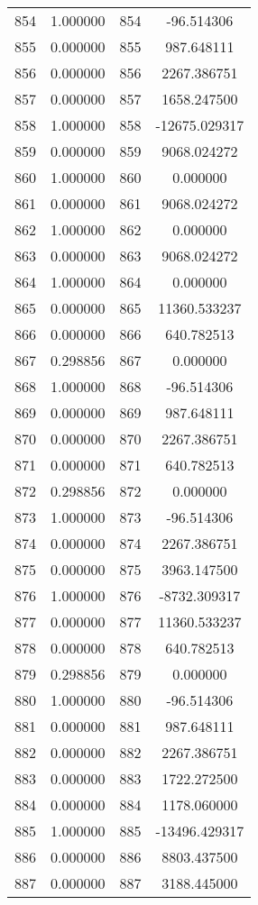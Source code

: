 \documentclass[12pt]{article}
\begin{document}
\begin{longtable}{@{}cccc@{}}
854 & 1.000000 & 854 & -96.514306 \\
855 & 0.000000 & 855 & 987.648111 \\
856 & 0.000000 & 856 & 2267.386751 \\
857 & 0.000000 & 857 & 1658.247500 \\
858 & 1.000000 & 858 & -12675.029317 \\
859 & 0.000000 & 859 & 9068.024272 \\
860 & 1.000000 & 860 & 0.000000 \\
861 & 0.000000 & 861 & 9068.024272 \\
862 & 1.000000 & 862 & 0.000000 \\
863 & 0.000000 & 863 & 9068.024272 \\
864 & 1.000000 & 864 & 0.000000 \\
865 & 0.000000 & 865 & 11360.533237 \\
866 & 0.000000 & 866 & 640.782513 \\
867 & 0.298856 & 867 & 0.000000 \\
868 & 1.000000 & 868 & -96.514306 \\
869 & 0.000000 & 869 & 987.648111 \\
870 & 0.000000 & 870 & 2267.386751 \\
871 & 0.000000 & 871 & 640.782513 \\
872 & 0.298856 & 872 & 0.000000 \\
873 & 1.000000 & 873 & -96.514306 \\
874 & 0.000000 & 874 & 2267.386751 \\
875 & 0.000000 & 875 & 3963.147500 \\
876 & 1.000000 & 876 & -8732.309317 \\
877 & 0.000000 & 877 & 11360.533237 \\
878 & 0.000000 & 878 & 640.782513 \\
879 & 0.298856 & 879 & 0.000000 \\
880 & 1.000000 & 880 & -96.514306 \\
881 & 0.000000 & 881 & 987.648111 \\
882 & 0.000000 & 882 & 2267.386751 \\
883 & 0.000000 & 883 & 1722.272500 \\
884 & 0.000000 & 884 & 1178.060000 \\
885 & 1.000000 & 885 & -13496.429317 \\
886 & 0.000000 & 886 & 8803.437500 \\
887 & 0.000000 & 887 & 3188.445000 \\

\end{longtable}
\end{document}
